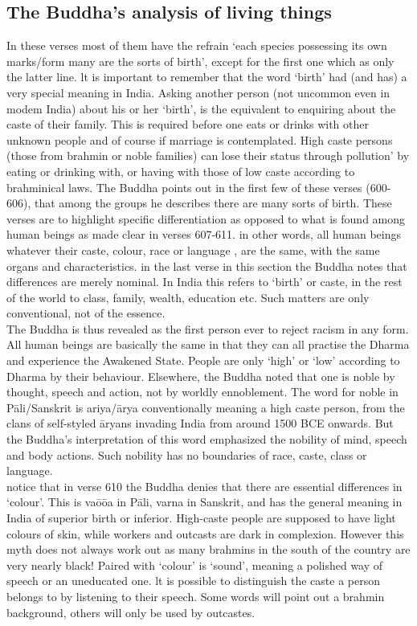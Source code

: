 \subsection{The Buddha's analysis of living things}
In these verses most of them have the refrain `each species possessing its own marks/form many are the sorts of birth', except for the first one which as only the latter line. lt is important to remember that the word `birth' had (and has) a very special meaning in India. Asking another person (not uncommon even in modem India) about his or her `birth', is the equivalent to enquiring about the caste of their family. This is required before one eats or drinks with other unknown people and of course if marriage is contemplated. High caste persons (those from brahmin or noble families) can lose their status through pollution' by eating or drinking with, or having with those of low caste according to brahminical laws. The Buddha points out in the first few of these verses (600-606), that among the groups he describes there are many sorts of birth. These verses are to highlight specific differentiation as opposed to what is found among human beings as made clear in verses 607-611. in other words, all human beings whatever their caste, colour, race or language , are the same, with the same organs and characteristics. in the last verse in this section the Buddha notes that differences are merely nominal. In India this refers to `birth' or caste, in the rest of the world to class, family, wealth, education etc. Such matters are only conventional, not of the essence.\\

The Buddha is thus revealed as the first person ever to reject racism in any form. All human beings are basically the same in that they can all practise the Dharma and experience the Awakened State. People are only `high' or `low' according to Dharma by their behaviour. Elsewhere, the Buddha noted that one is noble by thought, speech and action, not by worldly ennoblement. The word for noble in P\=ali/Sanskrit is ariya/\=arya conventionally meaning a high caste person, from the clans of self-styled \=aryans invading India from around 1500 BCE onwards. But the Buddha's interpretation of this word emphasized the nobility of mind, speech and body actions. Such nobility has no boundaries of race, caste, class or language.\\

notice that in verse 610 the Buddha denies that there are essential differences in `colour'. This is va\=o\=oa in P\=ali, varna in Sanskrit, and has the general meaning in India of superior birth or inferior. High-caste people are supposed to have light colours of skin, while workers and outcasts are dark in complexion. However this myth does not always work out as many brahmins in the south of the country are very nearly black! Paired with `colour' is `sound', meaning a polished way of speech or an uneducated one. lt is possible to distinguish the caste a person belongs to by listening to their speech. Some words will point out a brahmin background, others will only be used by outcastes.\\

